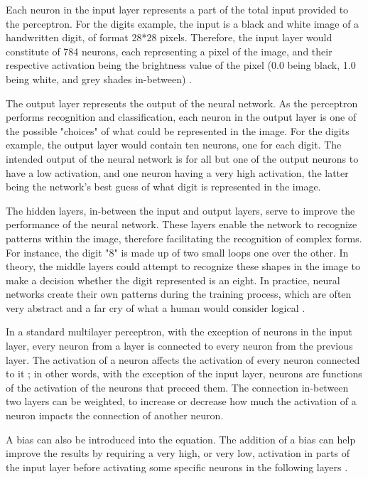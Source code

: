 \documentclass[12pt,a4paper,notitlepage]{article}
\begin{document}
Each neuron in the input layer represents a part of the total input provided to the perceptron. For the digits example, the input is a black and white image of a handwritten digit, of format 28*28 pixels. Therefore, the input layer would constitute of 784 neurons, each representing a pixel of the image, and their respective activation being the brightness value of the pixel (0.0 being black, 1.0 being white, and grey shades in-between) \cite{sanderson_but_2017}.

The output layer represents the output of the neural network. As the perceptron performs recognition and classification, each neuron in the output layer is one of the possible "choices" of what could be represented in the image. For the digits example, the output layer would contain ten neurons, one for each digit. The intended output of the neural network is for all but one of the output neurons to have a low activation, and one neuron having a very high activation, the latter being the network's best guess of what digit is represented in the image.

The hidden layers, in-between the input and output layers, serve to improve the performance of the neural network. These layers enable the network to recognize patterns within the image, therefore facilitating the recognition of complex forms. For instance, the digit "8" is made up of two small loops one over the other. In theory, the middle layers could attempt to recognize these shapes in the image to make a decision whether the digit represented is an eight. In practice, neural networks create their own patterns during the training process, which are often very abstract and a far cry of what a human would consider logical \cite{sanderson_gradient_2017}.

In a standard multilayer perceptron, with the exception of neurons in the input layer, every neuron from a layer is connected to every neuron from the previous layer. The activation of a neuron affects the activation of every neuron connected to it ; in other words, with the exception of the input layer, neurons are functions of the activation of the neurons that preceed them. The connection in-between two layers can be weighted, to increase or decrease how much the activation of a neuron impacts the connection of another neuron.

A bias can also be introduced into the equation. The addition of a bias can help improve the results by requiring a very high, or very low, activation in parts of the input layer before activating some specific neurons in the following layers \cite{sanderson_but_2017}.
\end{document}
